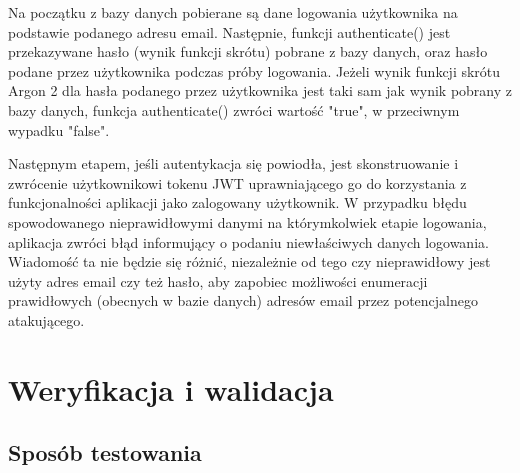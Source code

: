 \documentclass[a4paper,twoside,12pt]{book}
\begin{document}
Na początku z bazy danych pobierane są dane logowania użytkownika na podstawie podanego
adresu email. Następnie, funkcji authenticate() jest przekazywane hasło (wynik funkcji skrótu)
pobrane z bazy danych, oraz hasło podane przez użytkownika podczas próby logowania. 
Jeżeli wynik funkcji skrótu Argon 2 dla hasła podanego przez użytkownika jest taki sam
jak wynik pobrany z bazy danych, funkcja authenticate() zwróci wartość "true", w przeciwnym
wypadku "false". 

Następnym etapem, jeśli autentykacja się powiodła, jest skonstruowanie i zwrócenie
użytkownikowi tokenu JWT uprawniającego go do korzystania z funkcjonalności aplikacji
jako zalogowany użytkownik. W przypadku błędu spowodowanego nieprawidłowymi danymi
na którymkolwiek etapie logowania, aplikacja zwróci błąd informujący o podaniu niewłaściwych
danych logowania. Wiadomość ta nie będzie się różnić, niezależnie od tego czy nieprawidłowy
jest użyty adres email czy też hasło, aby zapobiec możliwości enumeracji prawidłowych
(obecnych w bazie danych) adresów email przez potencjalnego atakującego.


%      




\chapter{Weryfikacja i walidacja}
\label{ch:06}

\section{Sposób testowania}
\end{document}
